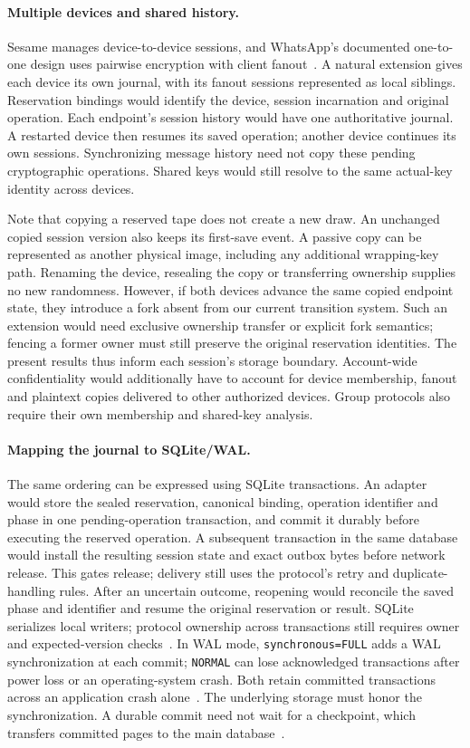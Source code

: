 \documentclass[pdflatex]{sn-jnl}
\theoremstyle{thmstyleone}
\theoremstyle{thmstylethree}
\theoremstyle{thmstyletwo}
\begin{document}
\paragraph{Multiple devices and shared history.}
Sesame manages device-to-device sessions, and WhatsApp's documented
one-to-one design uses pairwise encryption with client
fanout~\cite{sesame2017,whatsapp2021multidevice}.
A natural extension gives each device its own journal, with its fanout
sessions represented as local siblings. Reservation bindings would identify
the device, session incarnation and original operation. Each endpoint's
session history would have one authoritative journal. A restarted device
then resumes its saved operation; another device continues its own
sessions. Synchronizing message history need not copy these pending
cryptographic operations. Shared keys would still resolve to the same
actual-key identity across devices.

Note that copying a reserved tape does not create a new draw.
An unchanged copied session version also keeps its first-save event.
A passive copy can be represented as another physical image, including any
additional wrapping-key path. Renaming the device, resealing the copy or
transferring ownership supplies no new randomness. However, if both devices advance
the same copied endpoint state, they introduce a fork absent from our
current transition system. Such an extension would need exclusive ownership
transfer or explicit fork semantics; fencing a former owner must still
preserve the original reservation identities. The present results thus
inform each session's storage boundary. Account-wide confidentiality would
additionally have to account for device membership, fanout and plaintext
copies delivered to other authorized devices. Group protocols also require
their own membership and shared-key analysis.

\paragraph{Mapping the journal to SQLite/WAL.}
The same ordering can be expressed using SQLite transactions. An adapter
would store the sealed reservation, canonical binding, operation identifier
and phase in one pending-operation transaction, and commit it durably before
executing the reserved operation. A subsequent transaction in the same
database would install the resulting session state and exact outbox bytes
before network release. This gates release; delivery still uses the
protocol's retry and duplicate-handling rules. After an uncertain outcome,
reopening would reconcile the saved phase and identifier and resume the
original reservation or result. SQLite serializes local writers; protocol
ownership across transactions still requires owner and expected-version
checks~\cite{sqliteTransactions}.
In WAL mode, \texttt{synchronous=FULL} adds a WAL synchronization at each
commit; \texttt{NORMAL} can lose acknowledged transactions after power loss
or an operating-system crash. Both retain committed transactions across an
application crash alone~\cite{sqliteSynchronous}. The underlying storage
must honor the synchronization. A durable commit need not wait for a
checkpoint, which transfers committed pages to the main
database~\cite{sqliteWal}.
\end{document}
